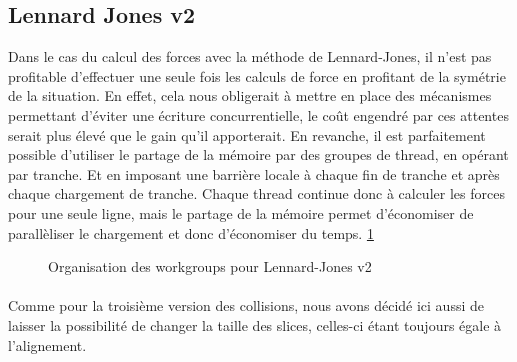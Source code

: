 \documentclass{article}
\begin{document}
\subsection{Lennard Jones v2}
Dans le cas du calcul des forces avec la méthode de Lennard-Jones, il n'est pas
profitable d'effectuer une seule fois les calculs de force en profitant de la
symétrie de la situation. En effet, cela nous obligerait à mettre en place des
mécanismes permettant d'éviter une écriture concurrentielle, le coût engendré
par ces attentes serait plus élevé que le gain qu'il apporterait.
En revanche, il est parfaitement possible d'utiliser le partage de la mémoire
par des groupes de thread, en opérant par tranche. Et en imposant une barrière
locale à chaque fin de tranche et après chaque chargement de tranche.
Chaque thread continue donc à calculer les forces pour une seule ligne, mais le
partage de la mémoire permet d'économiser de parallèliser le chargement et donc
d'économiser du temps. \ref{lennard-jones-v2}
\begin{figure}
  \caption{Organisation des workgroups pour Lennard-Jones v2}
  \label{lennard-jones-v2}
\end{figure}
\paragraph{}
Comme pour la troisième version des collisions, nous avons décidé ici aussi de
laisser la possibilité de changer la taille des slices, celles-ci étant toujours
égale à l'alignement.
\end{document}
